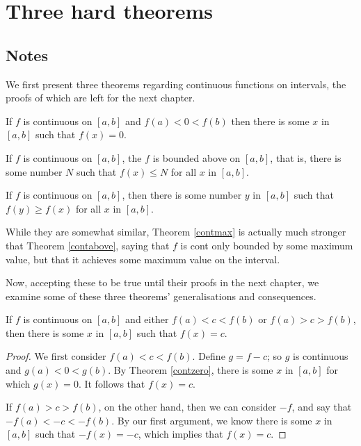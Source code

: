 \section{Three hard theorems}

\subsection{Notes}
We first present three theorems regarding continuous functions on intervals, the proofs of which are left for the next chapter.

\begin{theorem} \label{contzero}
If $f$ is continuous on $[a, b]$ and $f(a) < 0 < f(b)$ then there is some $x$ in $[a, b]$ such that $f(x) = 0$.
\end{theorem}

\begin{theorem} \label{contabove}
If $f$ is continuous on $[a, b]$, the $f$ is bounded above on $[a, b]$, that is, there is some number $N$ such that $f(x) \le N$ for all $x$ in $[a, b]$.
\end{theorem}

\begin{theorem} \label{contmax}
If $f$ is continuous on $[a, b]$, then there is some number $y$ in $[a, b]$ such that $f(y) \ge f(x)$ for all $x$ in $[a, b]$.

\begin{remark}
While they are somewhat similar, Theorem \ref{contmax} is actually much stronger that Theorem \ref{contabove}, saying that $f$ is cont only bounded by some maximum value, but that it achieves some maximum value on the interval.
\end{remark}
\end{theorem}

Now, accepting these to be true until their proofs in the next chapter, we examine some of these three theorems' generalisations and consequences.

\begin{theorem} \label{ivt}
If $f$ is continuous on $[a, b]$ and either $f(a) < c < f(b)$ or $f(a) > c > f(b)$, then there is some $x$ in $[a, b]$ such that $f(x) = c$.

\begin{proof}
We first consider $f(a) < c < f(b)$. Define $g = f - c$; so $g$ is continuous and $g(a) < 0 < g(b)$. By Theorem \ref{contzero}, there is some $x$ in $[a, b]$ for which $g(x) = 0$. It follows that $f(x) = c$.

If $f(a) > c > f(b)$, on the other hand, then we can consider $-f$, and say that $-f(a) < -c < -f(b)$. By our first argument, we know there is some $x$ in $[a, b]$ such that $-f(x) = -c$, which implies that $f(x) = c$.
\end{proof}
\end{theorem}

